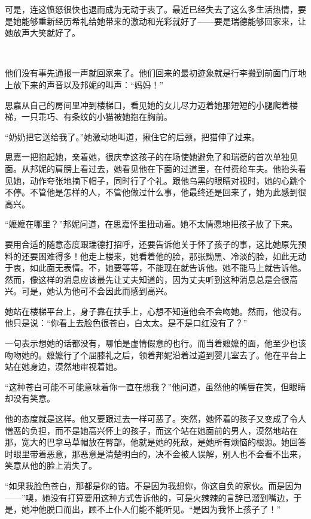 \par 可是，连这愤怒很快也退而成为无动于衷了。最近已经失去了这么多生活热情，要是她能够重新经历希礼给她带来的激动和光彩就好了——要是瑞德能够回家来，让她放声大笑就好了。
\par  
\par 他们没有事先通报一声就回家来了。他们回来的最初迹象就是行李搬到前面门厅地上放下来的声音以及邦妮的叫声：“妈妈！”
\par 思嘉从自己的房间里冲到楼梯口，看见她的女儿尽力迈着她那短短的小腿爬着楼梯，一只乖巧、有条纹的小猫被她抱在胸前。
\par “奶奶把它送给我了。”她激动地叫道，揪住它的后颈，把猫伸了过来。
\par 思嘉一把抱起她，亲着她，很庆幸这孩子的在场使她避免了和瑞德的首次单独见面。从邦妮的肩膀上看过去，她看见他在下面的过道里，在付费给车夫。他抬头看见她，动作夸张地摘下帽子，同时行了个礼。跟他乌黑的眼睛对视时，她的心跳个不停。不管他是怎样的人，不管他做过什么事，他最终还是回来了，她为此感到很高兴。
\par “嬷嬷在哪里？”邦妮问道，在思嘉怀里扭动着。她不太情愿地把孩子放了下来。
\par 要用合适的随意态度跟瑞德打招呼，还要告诉他关于怀了孩子的事，这比她原先预料的还要困难得多！他走上楼来，她看着他的脸，那张黝黑、冷淡的脸，如此无动于衷，如此面无表情。不，她要等等，不能现在就告诉他。她不能马上就告诉他。然而，像这样的消息应该最先让丈夫知道的，因为丈夫听到这种消息总是会很高兴。可是，她认为他可不会因此而感到高兴。
\par 她站在楼梯平台上，身子靠在扶手上，心想不知道他会不会吻她。然而，他没有。他只是说：“你看上去脸色很苍白，白太太。是不是口红没有了？”
\par 一句表示想她的话都没有，哪怕是虚情假意的也行。而当着嬷嬷的面，他至少也该吻吻她的。嬷嬷行了个屈膝礼之后，领着邦妮沿着过道到婴儿室去了。他在平台上站在她身边，漠然地审视着她。
\par “这种苍白可能不可能意味着你一直在想我？”他问道，虽然他的嘴唇在笑，但眼睛却没有笑意。
\par 他的态度就是这样。他又要跟过去一样可恶了。突然，她怀着的孩子又变成了令人憎恶的负担，而不是她高兴怀上的孩子，而这个站在她面前的男人，漠然地站在那，宽大的巴拿马草帽放在臀部，他就是她的死敌，是她所有烦恼的根源。她回答时眼里带着恶意，那恶意是清楚明白的，决不会被人误解，别人也不会看不出来，笑意从他的脸上消失了。
\par “如果我脸色苍白，那都是你的错。不是因为我想你，你这自负的家伙。而是因为——”噢，她没有打算要用这种方式告诉他的，可是火辣辣的言辞已溜到嘴边，于是，她冲他脱口而出，顾不上仆人们能不能听见。“是因为我怀上孩子了！”
